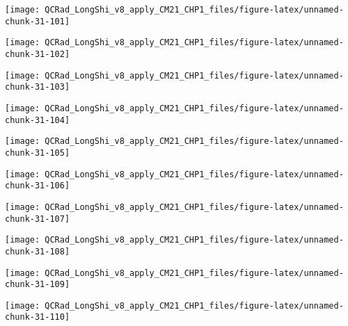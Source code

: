 \documentclass[
  10pt,
  a4paper,oneside]{article}
\begin{document}
\begin{center}\texttt{[image: QCRad\_LongShi\_v8\_apply\_CM21\_CHP1\_files/figure-latex/unnamed-chunk-31-101]} \end{center}

\begin{center}\texttt{[image: QCRad\_LongShi\_v8\_apply\_CM21\_CHP1\_files/figure-latex/unnamed-chunk-31-102]} \end{center}

\begin{center}\texttt{[image: QCRad\_LongShi\_v8\_apply\_CM21\_CHP1\_files/figure-latex/unnamed-chunk-31-103]} \end{center}

\begin{center}\texttt{[image: QCRad\_LongShi\_v8\_apply\_CM21\_CHP1\_files/figure-latex/unnamed-chunk-31-104]} \end{center}

\begin{center}\texttt{[image: QCRad\_LongShi\_v8\_apply\_CM21\_CHP1\_files/figure-latex/unnamed-chunk-31-105]} \end{center}

\begin{center}\texttt{[image: QCRad\_LongShi\_v8\_apply\_CM21\_CHP1\_files/figure-latex/unnamed-chunk-31-106]} \end{center}

\begin{center}\texttt{[image: QCRad\_LongShi\_v8\_apply\_CM21\_CHP1\_files/figure-latex/unnamed-chunk-31-107]} \end{center}

\begin{center}\texttt{[image: QCRad\_LongShi\_v8\_apply\_CM21\_CHP1\_files/figure-latex/unnamed-chunk-31-108]} \end{center}

\begin{center}\texttt{[image: QCRad\_LongShi\_v8\_apply\_CM21\_CHP1\_files/figure-latex/unnamed-chunk-31-109]} \end{center}

\begin{center}\texttt{[image: QCRad\_LongShi\_v8\_apply\_CM21\_CHP1\_files/figure-latex/unnamed-chunk-31-110]} \end{center}
\end{document}
